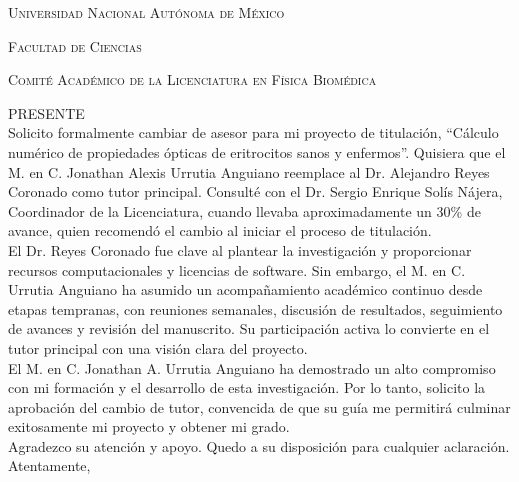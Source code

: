 \documentclass[11pt,letterpaper]{article}
\begin{document}
	

	
	\hspace{9cm}{\raggedleft Ciudad Universitaria, 07 de septiembre de 2026}
	
	\hspace{1cm}
	
	\vspace{0.2cm}
	
	\noindent\textsc{Universidad Nacional Autónoma de México}
	
	\noindent\textsc{Facultad de Ciencias
	}
		
	\noindent\textsc{Comité Académico de la Licenciatura en Física Biomédica
	}
	
	\noindent\textsc{PRESENTE}\\
	
	\noindent
	Solicito formalmente cambiar de asesor para mi proyecto de titulación, “Cálculo numérico de propiedades ópticas de eritrocitos sanos y enfermos”. Quisiera que el M. en C. Jonathan Alexis Urrutia Anguiano reemplace al Dr. Alejandro Reyes Coronado como tutor principal. Consulté con el Dr. Sergio Enrique Solís Nájera, Coordinador de la Licenciatura, cuando llevaba aproximadamente un 30\% de avance, quien recomendó el cambio al iniciar el proceso de titulación.\\
	
	El Dr. Reyes Coronado fue clave al plantear la investigación y proporcionar recursos computacionales y licencias de software. Sin embargo, el M. en C. Urrutia Anguiano ha asumido un acompañamiento académico continuo desde etapas tempranas, con reuniones semanales, discusión de resultados, seguimiento de avances y revisión del manuscrito. Su participación activa lo convierte en el tutor principal con una visión clara del proyecto.\\
	
	El M. en C. Jonathan A. Urrutia Anguiano ha demostrado un alto compromiso con mi formación y el desarrollo de esta investigación. Por lo tanto, solicito la aprobación del cambio de tutor, convencida de que su guía me permitirá culminar exitosamente mi proyecto y obtener mi grado.\\
	
	Agradezco su atención y apoyo. Quedo a su disposición para cualquier aclaración.\\
	
	Atentamente,
\vspace{.7cm}
\end{document}
